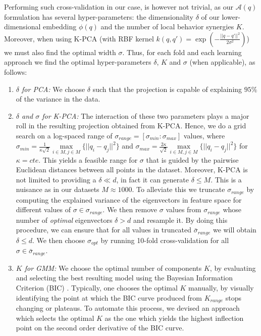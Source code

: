 \documentclass[letterpaper, 10 pt, conference,fleqn]{ieeeconf}
\begin{document}
Performing such cross-validation in our case, is however not trivial, as our $\mathcal{A}(q)$ formulation has several hyper-parameters: the dimensionality $\delta$ of our lower-dimensional embedding $\phi(q)$ and the number of local behavior synergies $K$. Moreover, when using K-PCA (with RBF kernel $k(q,q') = \exp(-\frac{||q-q'||^2}{2\sigma^2})$) we must also find the optimal width $\sigma$. Thus, for each fold and each learning approach we find the optimal hyper-parameters $\delta$, $K$ and $\sigma$ (when applicable), as follows:
\begin{enumerate}[leftmargin=*]
\item \textit{$\delta$ for PCA:} We choose $\delta$ such that the projection is capable of explaining $95\%$ of the variance in the data.
\item \textit{$\delta$ and $\sigma$ for K-PCA:} The interaction of these two parameters plays a major roll in the resulting projection obtained from K-PCA. Hence, we do a grid search on a log-spaced range of $\sigma_{range} = [\sigma_{min}:\sigma_{max}]$ values, where 
$\sigma_{min} = \frac{1}{\kappa\sqrt{2}} \underset{i \in M,j\in M}{\max}\{||q_i - q_j||^2\}$ and $\sigma_{max} = \frac{2\kappa}{\sqrt{2}} \underset{i \in M,j\in M}{\max}\{||q_i - q_j||^2\}$ for $\kappa = cte.$ This yields a feasible range for $\sigma$ that is guided by the pairwise Euclidean distances between all points in the dataset. Moreover, K-PCA is not limited to providing a $\delta \ll d$, in fact it can generate $\delta \le M$. This is a nuisance as in our datasets $M\approx1000$. To alleviate this we truncate $\sigma_{range}$ by computing the explained variance of the eigenvectors in feature space for different values of  $\sigma \in \sigma_{range}$. We then remove $\sigma$ values from $\sigma_{range}$ whose number of \textit{optimal} eigenvectors $\delta > d$ and resample it. By doing this procedure, we can ensure that for all values in truncated $\bar{\sigma}_{range}$ we will obtain $\delta \le d$. We then choose $\sigma_{opt}$ by running 10-fold cross-validation for all $\sigma \in \bar{\sigma}_{range}$. 
\item \textit{$K$ for GMM:} We choose the optimal number of components $K$, by evaluating and selecting the best resulting model using the Bayesian Information Criterion (BIC) \cite{Bishop:PRM:2006}. Typically, one chooses the optimal $K$ manually, by visually identifying the point at which the BIC curve produced from $K_{range}$ stops changing or plateaus. To automate this process, we devised an approach which selects the optimal $K$ as the one which yields the highest inflection point on the second order derivative of the BIC curve.
\end{enumerate}
\end{document}
